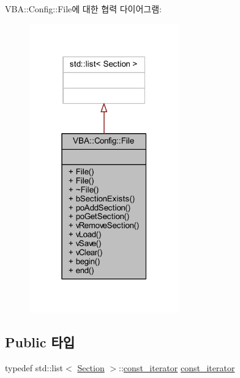 V\+BA\+:\+:Config\+:\+:File에 대한 협력 다이어그램\+:\nopagebreak
\begin{figure}[H]
\begin{center}
\leavevmode
\includegraphics[width=183pt]{class_v_b_a_1_1_config_1_1_file__coll__graph}
\end{center}
\end{figure}
\subsection*{Public 타입}
\begin{DoxyCompactItemize}
\item 
typedef std\+::list$<$ \mbox{\hyperlink{class_v_b_a_1_1_config_1_1_section}{Section}} $>$\+::\mbox{\hyperlink{class_v_b_a_1_1_config_1_1_file_a3c4cd2c1e02bbe2dfff43c4e89c71edb}{const\+\_\+iterator}} \mbox{\hyperlink{class_v_b_a_1_1_config_1_1_file_a3c4cd2c1e02bbe2dfff43c4e89c71edb}{const\+\_\+iterator}}
\end{DoxyCompactItemize}
